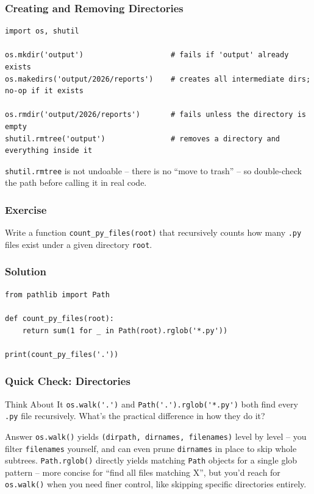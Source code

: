 \begin{frame}[fragile]\frametitle{Creating and Removing Directories}
\begin{lstlisting}
import os, shutil

os.mkdir('output')                    # fails if 'output' already exists
os.makedirs('output/2026/reports')    # creates all intermediate dirs; no-op if it exists

os.rmdir('output/2026/reports')       # fails unless the directory is empty
shutil.rmtree('output')               # removes a directory and everything inside it
\end{lstlisting}
\lstinline|shutil.rmtree| is not undoable -- there is no ``move to trash'' -- so double-check
the path before calling it in real code.
\end{frame}

\begin{frame}[fragile]\frametitle{Exercise}
Write a function \lstinline|count_py_files(root)| that recursively counts how many \texttt{.py}
files exist under a given directory \texttt{root}.
\end{frame}

\begin{frame}[fragile]\frametitle{Solution}
\begin{lstlisting}
from pathlib import Path

def count_py_files(root):
    return sum(1 for _ in Path(root).rglob('*.py'))

print(count_py_files('.'))
\end{lstlisting}
\end{frame}

\begin{frame}[fragile]\frametitle{Quick Check: Directories}
\begin{block}{Think About It}
\lstinline|os.walk('.')| and \lstinline|Path('.').rglob('*.py')| both find every \texttt{.py}
file recursively. What's the practical difference in how they do it?
\end{block}
\pause
\begin{block}{Answer}
\lstinline|os.walk()| yields \texttt{(dirpath, dirnames, filenames)} level by level -- you
filter \texttt{filenames} yourself, and can even prune \texttt{dirnames} in place to skip whole
subtrees. \lstinline|Path.rglob()| directly yields matching \texttt{Path} objects for a single
glob pattern -- more concise for ``find all files matching X'', but you'd reach for
\lstinline|os.walk()| when you need finer control, like skipping specific directories entirely.
\end{block}
\end{frame}